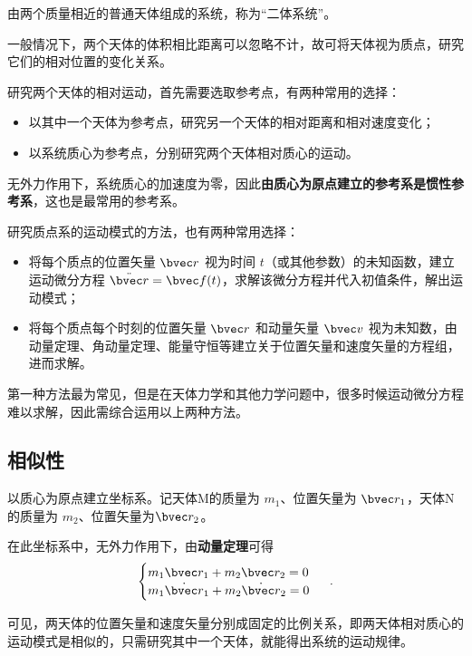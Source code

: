 

由两个质量相近的普通天体组成的系统，称为“二体系统”。

一般情况下，两个天体的体积相比距离可以忽略不计，故可将天体视为质点，研究它们的相对位置的变化关系。

研究两个天体的相对运动，首先需要选取参考点，有两种常用的选择：
\begin{itemize}
\item 以其中一个天体为参考点，研究另一个天体的相对距离和相对速度变化；
\item 以系统质心为参考点，分别研究两个天体相对质心的运动。
\end{itemize}

无外力作用下，系统质心的加速度为零，因此\textbf{由质心为原点建立的参考系是惯性参考系}，这也是最常用的参考系。

研究质点系的运动模式的方法，也有两种常用选择：
\begin{itemize}
\item 将每个质点的位置矢量 $\bvec r$ 视为时间 $t$（或其他参数）的未知函数，建立运动微分方程 $\ddot{\bvec r}= \bvec f (t)$，求解该微分方程并代入初值条件，解出运动模式；
\item 将每个质点每个时刻的位置矢量 $\bvec r$ 和动量矢量 $\bvec v$ 视为未知数，由动量定理、角动量定理、能量守恒等建立关于位置矢量和速度矢量的方程组，进而求解。
\end{itemize}
第一种方法最为常见，但是在天体力学和其他力学问题中，很多时候运动微分方程难以求解，因此需综合运用以上两种方法。

\subsection{相似性}
以质心为原点建立坐标系。记天体M的质量为 $m_1$、位置矢量为 $\bvec r_1$，天体N的质量为 $m_2$、位置矢量为$\bvec r_2$。

在此坐标系中，无外力作用下，由\textbf{动量定理}可得
\begin{equation}
\begin{cases}
m_1 \bvec r_1 + m_2 \bvec r_2 = 0\\
m_1 \dot{\bvec r}_1 + m_2 \dot{\bvec r}_2=0
\end{cases}~.
\end{equation}

可见，两天体的位置矢量和速度矢量分别成固定的比例关系，即两天体相对质心的运动模式是相似的，只需研究其中一个天体，就能得出系统的运动规律。

